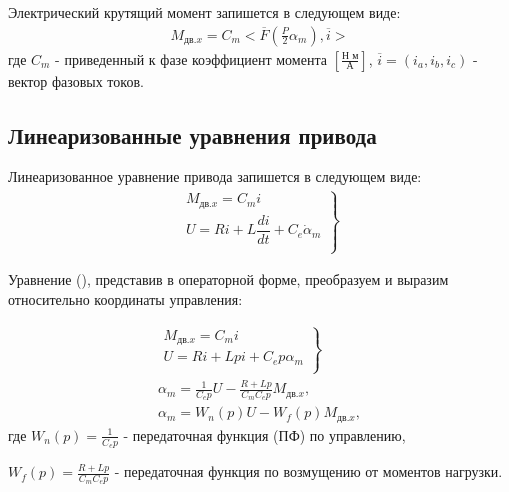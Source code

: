 Электрический крутящий момент запишется в следующем виде:
\begin{equation}
\label{eq:p3:9.4}
\begin{alignedat}{2}
M_{\textit{дв.x}} = C_m <\overline{F}(\frac{\textit{P}}{2}\alpha_m),\overline{i}>
\end{alignedat}
\end{equation}
где
$C_m$ - приведенный к фазе коэффициент момента $[\frac{\textit{Н м}}{\textit{А}} ]$,
$\overline{i} = (i_a, i_b, i_c)$ - вектор фазовых токов.

\subsection{Линеаризованные уравнения привода} \label{sec:ch3/sec9/linearize}

Линеаризованное уравнение привода запишется в следующем виде:
\begin{equation}
\label{eq:p3:lin1}
\begin{alignedat}{2}
\left.
\begin{matrix}
M_{\textit{дв.x}} = C_m i\\
U = R i + L \dfrac{d i}{dt} + C_e \dot{\alpha}_m \\
\end{matrix}
\right\rbrace 
\end{alignedat}
\end{equation}

Уравнение (), представив в операторной форме, преобразуем и выразим относительно координаты управления:

\begin{equation}
\label{eq:p3:lin2}
\begin{multlined}
\left.
\begin{matrix}
M_{\textit{дв.x}} = C_m i\\
U = R i + L p i + C_e p \alpha_m \\
\end{matrix}
\right\rbrace \\
\alpha_m = \frac{1}{C_e p} U - \frac{R + L p}{C_m C_e p} M_{\textit{дв.x}},\\
\alpha_m = W_n(p) U - W_f(p) M_{\textit{дв.x}},
\end{multlined}
\end{equation}
где
$W_n(p) = \frac{1}{C_e p}$ - передаточная функция (ПФ) по управлению,

$W_f(p) = \frac{R + L p}{C_m C_e p}$ - передаточная функция по возмущению от моментов нагрузки.

